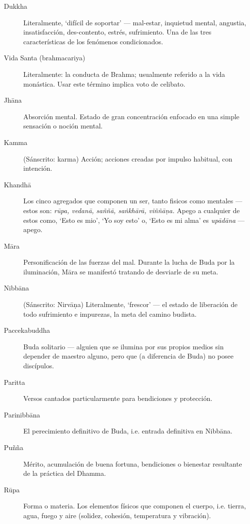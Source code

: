 \begin{description}
\item[Dukkha] Literalmente, ‘difícil de soportar’ --- mal-estar, inquietud mental, angustia, insatisfacción, des-contento, estrés, sufrimiento. Una de las tres características de los fenómenos condicionados.


\item[Vida Santa (brahmacariya)] Literalmente: la conducta de Brahma; usualmente referido a la vida monástica. Usar este término implica voto de celibato.

\item[Jhāna] Absorción mental. Estado de gran concentración enfocado en una simple sensación o noción mental.

\item[Kamma] (Sánscrito: karma) Acción; acciones creadas por impulso habitual, con intención.

\item[Khandhā] Los cinco agregados que componen un ser, tanto fisicos como mentales ---
  estos son: \emph{rūpa, vedanā, saññā, saṅkhārā, viññāṇa.} Apego a cualquier de estos como, ‘Esto es mio’, ‘Yo soy esto’ o, ‘Esto es mi alma’ es
  \emph{upādāna} --- apego.

\item[Māra] Personificación de las fuerzas del mal. Durante la lucha de Buda por la iluminación, Māra se manifestó tratando de desviarle de su meta.

\item[Nibbāna] (Sánscrito: Nirvāṇa) Literalmente, ‘frescor’ --- el estado de liberación de todo sufrimiento e impurezas, la meta del camino budista.

\item[Paccekabuddha] Buda solitario --- alguien que se ilumina por sus propios medios sin depender de maestro alguno, pero que (a diferencia de Buda) no posee discípulos.

\item[Paritta] Versos cantados particularmente para bendiciones y protección.

\item[Parinibbāna] El perecimiento definitivo de Buda, i.e. entrada definitiva en 
  Nibbāna.

\item[Puñña] Mérito, acumulación de buena fortuna, bendiciones o bienestar resultante de la práctica del Dhamma.

\item[Rūpa] Forma o materia. Los elementos físicos que componen el cuerpo,
  i.e. tierra, agua, fuego y aire (solidez, cohesión, temperatura y
  vibración).


\end{description}

